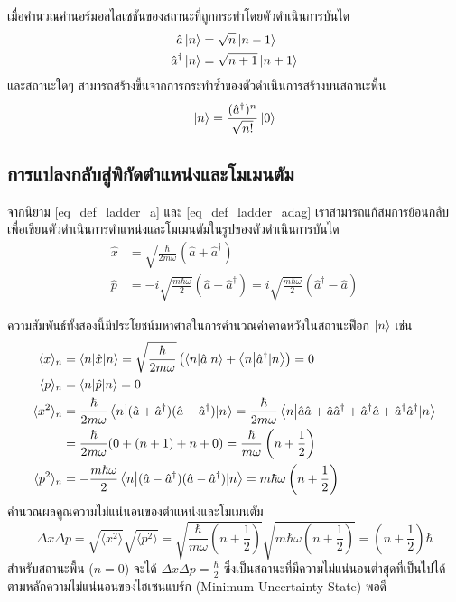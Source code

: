 เมื่อคำนวณค่านอร์มอลไลเซชันของสถานะที่ถูกกระทำโดยตัวดำเนินการบันได
\begin{align}
\hat{a}\ket{n} &= \sqrt{n}\ket{n - 1} \label{eq_action_a} \\
\hat{a}^\dagger\ket{n} &= \sqrt{n + 1}\ket{n + 1} \label{eq_action_adag}
\end{align}
และสถานะใดๆ สามารถสร้างขึ้นจากการกระทำซ้ำของตัวดำเนินการสร้างบนสถานะพื้น
\begin{equation}
\ket{n} = \frac{(\hat{a}^\dagger)^n}{\sqrt{n!}}\ket{0} \label{eq_state_creation_formula}
\end{equation}

\subsection{การแปลงกลับสู่พิกัดตำแหน่งและโมเมนตัม}
จากนิยาม \eqref{eq_def_ladder_a} และ \eqref{eq_def_ladder_adag} เราสามารถแก้สมการย้อนกลับเพื่อเขียนตัวดำเนินการตำแหน่งและโมเมนตัมในรูปของตัวดำเนินการบันได
\begin{align}
\hat{x} &= \sqrt{\frac{\hbar}{2m\omega}}\left( \hat{a} + \hat{a}^\dagger \right) \label{eq_x_in_terms_of_a} \\
\hat{p} &= -i\sqrt{\frac{m\hbar\omega}{2}}\left( \hat{a} - \hat{a}^\dagger \right) = i\sqrt{\frac{m\hbar\omega}{2}}\left( \hat{a}^\dagger - \hat{a} \right) \label{eq_p_in_terms_of_a}
\end{align}

ความสัมพันธ์ทั้งสองนี้มีประโยชน์มหาศาลในการคำนวณค่าคาดหวังในสถานะฟ็อก $\ket{n}$ เช่น
\begin{align}
\langle x \rangle_n &= \braket{n}{\hat{x}|n} = \sqrt{\frac{\hbar}{2m\omega}}\left( \braket{n}{\hat{a}|n} + \braket{n}{\hat{a}^\dagger|n} \right) = 0 \\
\langle p \rangle_n &= \braket{n}{\hat{p}|n} = 0 \\
\langle x^2 \rangle_n &= \frac{\hbar}{2m\omega}\braket{n}{(\hat{a} + \hat{a}^\dagger)(\hat{a} + \hat{a}^\dagger)|n} = \frac{\hbar}{2m\omega}\braket{n}{\hat{a}\hat{a} + \hat{a}\hat{a}^\dagger + \hat{a}^\dagger\hat{a} + \hat{a}^\dagger\hat{a}^\dagger|n} \nonumber \\
&= \frac{\hbar}{2m\omega}(0 + (n + 1) + n + 0) = \frac{\hbar}{m\omega}\left(n + \frac{1}{2}\right) \\
\langle p^2 \rangle_n &= -\frac{m\hbar\omega}{2}\braket{n}{(\hat{a} - \hat{a}^\dagger)(\hat{a} - \hat{a}^\dagger)|n} = m\hbar\omega\left(n + \frac{1}{2}\right)
\end{align}
คำนวณผลคูณความไม่แน่นอนของตำแหน่งและโมเมนตัม
\begin{equation}
\Delta x \Delta p = \sqrt{\langle x^2 \rangle}\sqrt{\langle p^2 \rangle} = \sqrt{\frac{\hbar}{m\omega}\left(n + \frac{1}{2}\right)}\sqrt{m\hbar\omega\left(n + \frac{1}{2}\right)} = \left(n + \frac{1}{2}\right)\hbar
\end{equation}
สำหรับสถานะพื้น ($n = 0$) จะได้ $\Delta x \Delta p = \frac{\hbar}{2}$ ซึ่งเป็นสถานะที่มีความไม่แน่นอนต่ำสุดที่เป็นไปได้ตามหลักความไม่แน่นอนของไฮเซนแบร์ก (Minimum Uncertainty State) พอดี

